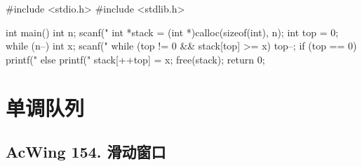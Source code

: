 \begin{mycpptwocol}[单调栈]
    #include <stdio.h>
    #include <stdlib.h>

    int main() {
        int n;
        scanf("%
        int *stack = (int *)calloc(sizeof(int), n);
        int top = 0;
        while (n--) {
            int x;
            scanf("%
            while (top != 0 && stack[top] >= x) {
                top--;
            }
            if (top == 0) {
                printf("%
            } else {
                printf("%
            }
            stack[++top] = x;
        }
        free(stack);
        return 0;
    }
\end{mycpptwocol}


\section{单调队列}

\subsection{AcWing 154. 滑动窗口}

